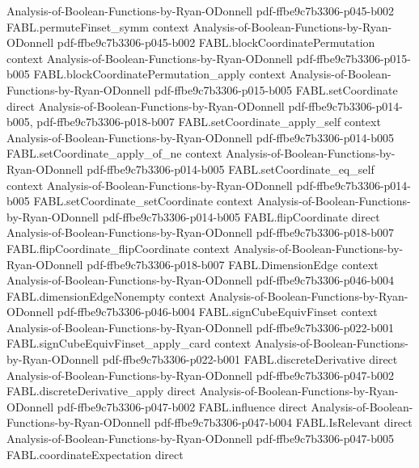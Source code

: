 \begin{theorem}
  {Analysis-of-Boolean-Functions-by-Ryan-ODonnell}
  {pdf-ffbe9c7b3306-p045-b002}
\proofstep
  {FABL.permuteFinset_symm}
  {context}
  {Analysis-of-Boolean-Functions-by-Ryan-ODonnell}
  {pdf-ffbe9c7b3306-p045-b002}
\proofstep
  {FABL.blockCoordinatePermutation}
  {context}
  {Analysis-of-Boolean-Functions-by-Ryan-ODonnell}
  {pdf-ffbe9c7b3306-p015-b005}
\proofstep
  {FABL.blockCoordinatePermutation_apply}
  {context}
  {Analysis-of-Boolean-Functions-by-Ryan-ODonnell}
  {pdf-ffbe9c7b3306-p015-b005}
\proofstep
  {FABL.setCoordinate}
  {direct}
  {Analysis-of-Boolean-Functions-by-Ryan-ODonnell}
  {pdf-ffbe9c7b3306-p014-b005,
    pdf-ffbe9c7b3306-p018-b007}
\proofstep
  {FABL.setCoordinate_apply_self}
  {context}
  {Analysis-of-Boolean-Functions-by-Ryan-ODonnell}
  {pdf-ffbe9c7b3306-p014-b005}
\proofstep
  {FABL.setCoordinate_apply_of_ne}
  {context}
  {Analysis-of-Boolean-Functions-by-Ryan-ODonnell}
  {pdf-ffbe9c7b3306-p014-b005}
\proofstep
  {FABL.setCoordinate_eq_self}
  {context}
  {Analysis-of-Boolean-Functions-by-Ryan-ODonnell}
  {pdf-ffbe9c7b3306-p014-b005}
\proofstep
  {FABL.setCoordinate_setCoordinate}
  {context}
  {Analysis-of-Boolean-Functions-by-Ryan-ODonnell}
  {pdf-ffbe9c7b3306-p014-b005}
\proofstep
  {FABL.flipCoordinate}
  {direct}
  {Analysis-of-Boolean-Functions-by-Ryan-ODonnell}
  {pdf-ffbe9c7b3306-p018-b007}
\proofstep
  {FABL.flipCoordinate_flipCoordinate}
  {context}
  {Analysis-of-Boolean-Functions-by-Ryan-ODonnell}
  {pdf-ffbe9c7b3306-p018-b007}
\proofstep
  {FABL.DimensionEdge}
  {context}
  {Analysis-of-Boolean-Functions-by-Ryan-ODonnell}
  {pdf-ffbe9c7b3306-p046-b004}
\proofstep
  {FABL.dimensionEdgeNonempty}
  {context}
  {Analysis-of-Boolean-Functions-by-Ryan-ODonnell}
  {pdf-ffbe9c7b3306-p046-b004}
\proofstep
  {FABL.signCubeEquivFinset}
  {context}
  {Analysis-of-Boolean-Functions-by-Ryan-ODonnell}
  {pdf-ffbe9c7b3306-p022-b001}
\proofstep
  {FABL.signCubeEquivFinset_apply_card}
  {context}
  {Analysis-of-Boolean-Functions-by-Ryan-ODonnell}
  {pdf-ffbe9c7b3306-p022-b001}
\proofstep
  {FABL.discreteDerivative}
  {direct}
  {Analysis-of-Boolean-Functions-by-Ryan-ODonnell}
  {pdf-ffbe9c7b3306-p047-b002}
\proofstep
  {FABL.discreteDerivative_apply}
  {direct}
  {Analysis-of-Boolean-Functions-by-Ryan-ODonnell}
  {pdf-ffbe9c7b3306-p047-b002}
\proofstep
  {FABL.influence}
  {direct}
  {Analysis-of-Boolean-Functions-by-Ryan-ODonnell}
  {pdf-ffbe9c7b3306-p047-b004}
\proofstep
  {FABL.IsRelevant}
  {direct}
  {Analysis-of-Boolean-Functions-by-Ryan-ODonnell}
  {pdf-ffbe9c7b3306-p047-b005}
\proofstep
  {FABL.coordinateExpectation}
  {direct}

\end{theorem}
